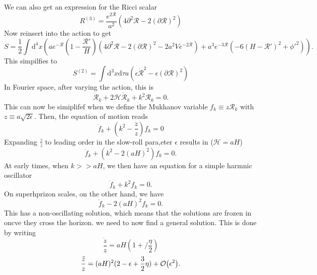 \documentclass[12pt]{article}
\begin{document}
We can also get an expression for the Ricci scalar
\begin{equation}
    R^{(3)} = \frac{e^{2\mathcal{R}}}{a^2}(4 \partial^2 \mathcal{R}-2(\partial\mathcal{R})^2)
\end{equation}
Now reinsert into the action to get
\begin{equation}
    S = \frac{1}{2} \int \mathrm{d}^4x\left( ae^{-\mathcal{R}}\left(1-\frac{\mathcal{R'}}{H}\right)\left(4\partial^2 \mathcal{R} - 2(\partial\mathcal{R})^2 - 2a^2Ve^{-2\mathcal{R}}\right)+a^3e^{-3\mathcal{R}}\left(-6(H-\mathcal{R}')^2 + \phi'^2\right)\right).
\end{equation}
This simpilfies to 
\begin{equation}
    S^{(2)} = \int \mathrm{d}^3x \mathrm{d}\tau a \left(\epsilon \dot{\mathcal{R}}^2 - \epsilon (\partial \mathcal{R})^2\right)
\end{equation}
In Fourier space, after varying the action, this is 
\begin{equation}
    \ddot{\mathcal{R}}_k + 2\mathcal{H}\dot{\mathcal{R}}_k + k^2 \mathcal{R}_k = 0.
\end{equation}
This can now be simiplifef when we define the Mukhanov variable $f_k \equiv z \mathcal{R}_k$ with $z \equiv a \sqrt{2 \epsilon}$. Then, the equation of motion reads 
\begin{equation}
    \ddot{f}_k + \left(k^2 - \frac{\ddot{z}}{z} \right) f_k = 0
\end{equation}
Expanding $\frac{\ddot{z}}{z}$ to leading order in the slow-roll para,eter $\epsilon$ results in ($\mathcal{H} = aH$)
\begin{equation}
    \ddot{f}_k + \left(k^2 - 2 (aH)^2 \right) f_k = 0.
\end{equation}
At early times, when $k>>aH$, we then have an equation for a simple harmnic oscillator
\begin{equation}
    \ddot{f}_k + k^2 f_k = 0.
\end{equation}
On superhprizon scales, on the other hand, we have
\begin{equation}
    \ddot{f}_k - 2 (aH)^2 f_k = 0.
\end{equation}
This has a non-oscillating solution, which means that the solutions are frozen in oncve they cross the horizon. we need to now find a general solution. This is done by writing
\begin{equation}
    \frac{\dot{z}}{z} = aH(1+/\frac{\eta}{2})
\end{equation}
\begin{equation}
    \frac{\ddot{z}}{z} = (aH)^2 (2-\epsilon+ \frac{3}{2}\eta)+\order{\epsilon^2}.
\end{equation}
\end{document}
